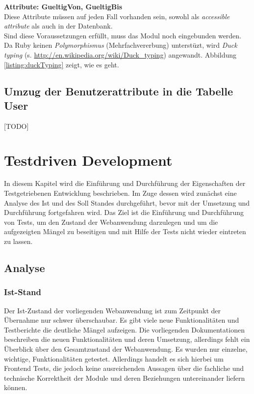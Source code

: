 \documentclass[12pt,             %
               a4paper,          %
               listof=totoc,     %
               index=totoc,      %
               bibliography=totoc,%
               oneside,         %
               BCOR1cm,          %
               english   %
               ]{scrbook}
\begin{document}
\textbf{Attribute: GueltigVon, GueltigBis}\\
Diese Attribute müssen auf jeden Fall vorhanden sein, sowohl als \textit{accessible attribute} als auch in der Datenbank. \\

Sind diese Voraussetzungen erfüllt, muss das Modul noch eingebunden werden. Da Ruby keinen \textit{Polymorphismus} (Mehrfachvererbung) unterstüzt, wird \textit{Duck typing} (s. \url{http://en.wikipedia.org/wiki/Duck_typing}) angewandt. Abbildung \vref{listing:duckTyping} zeigt, wie es geht.

\label{listing:duckTyping}


\section{Umzug der Benutzerattribute in die Tabelle User}
[TODO]

\clearpage
\chapter{Testdriven Development}
In diesem Kapitel wird die Einführung und Durchführung der Eigenschaften der Testgetriebenen Entwicklung beschrieben. Im Zuge dessen wird zunächst eine Analyse des Ist und des Soll Standes durchgeführt, bevor mit der Umsetzung und Durchführung fortgefahren wird. Das Ziel ist die Einführung und Durchführung von Tests, um den Zustand der Webanwendung darzulegen und um die aufgezeigten Mängel zu beseitigen und mit Hilfe der Tests nicht wieder eintreten zu lassen.    

\section{Analyse}
\subsection{Ist-Stand}
Der Ist-Zustand der vorliegenden Webanwendung ist zum Zeitpunkt der Übernahme nur schwer überschaubar. Es gibt viele neue Funktionalitäten und Testberichte die deutliche Mängel aufzeigen. Die vorliegenden Dokumentationen beschreiben die neuen Funktionalitäten und deren Umsetzung, allerdings fehlt ein Überblick über den Gesamtzustand der Webanwendung. Es wurden nur einzelne, wichtige, Funktionalitäten getestet. Allerdings handelt es sich hierbei um Frontend Tests, die jedoch keine ausreichenden Aussagen über die fachliche und technische Korrektheit der Module und deren Beziehungen untereinander liefern können.\\
\end{document}
